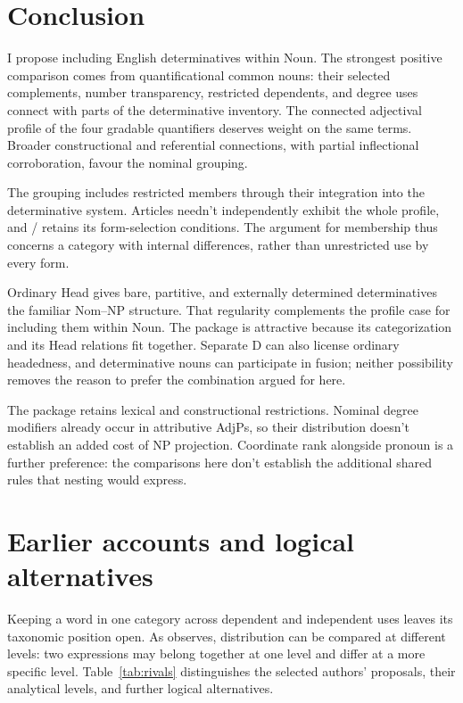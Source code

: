 \documentclass[12pt]{article}
\begin{document}
\section{Conclusion}\label{sec:conclusion}

I propose including English determinatives within Noun. The strongest positive comparison comes from quantificational common nouns: their selected complements, number transparency, restricted dependents, and degree uses connect with parts of the determinative inventory. The connected adjectival profile of the four gradable quantifiers deserves weight on the same terms. Broader constructional and referential connections, with partial inflectional corroboration, favour the nominal grouping.

The grouping includes restricted members through their integration into the determinative system. Articles needn't independently exhibit the whole profile, and / retains its form-selection conditions. The argument for membership thus concerns a category with internal differences, rather than unrestricted use by every form.

Ordinary Head gives bare, partitive, and externally determined determinatives the familiar Nom--NP structure. That regularity complements the profile case for including them within Noun. The package is attractive because its categorization and its Head relations fit together. Separate D can also license ordinary headedness, and determinative nouns can participate in fusion; neither possibility removes the reason to prefer the combination argued for here.

The package retains lexical and constructional restrictions. Nominal degree modifiers already occur in attributive AdjPs, so their distribution doesn't establish an added cost of NP projection. Coordinate rank alongside pronoun is a further preference: the comparisons here don't establish the additional shared rules that nesting would express.

\appendix

\section{Earlier accounts and logical alternatives}\label{sec:historical}

Keeping a word in one category across dependent and independent uses leaves its taxonomic position open. As \textcite[232--235]{lyons1968} observes, distribution can be compared at different levels: two expressions may belong together at one level and differ at a more specific level. Table~\ref{tab:rivals} distinguishes the selected authors' proposals, their analytical levels, and further logical alternatives.
\end{document}
